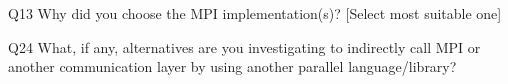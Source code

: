 \begin{description}%
\item{Q13} Why did you choose the MPI implementation(s)? [Select most suitable one]%
\item{Q24} What, if any, alternatives are you investigating to indirectly call MPI or another communication layer by using another parallel language/library?%
\end{description}%

